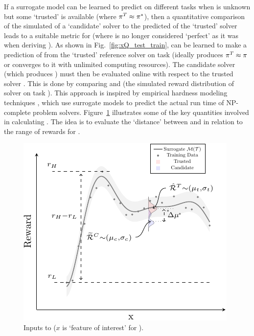 If a surrogate model \surrogate{} can be learned to predict \rwdtrust{} on different tasks when \piopt{} is unknown but some `trusted' \pitrust{} is available (where $\pi^T \approx \pi^*$), then a quantitative comparison of the simulated \rwdcandsim{} of a `candidate' solver to the predicted \rwdtrustpredict{} of the `trusted' solver leads to a suitable metric for \xQ{} (where \xQ{} is no longer considered `perfect' as it was when deriving \xO). 
As shown in Fig.~\ref{fig:xQ_test_train}, \surrogate{} can be learned to make a prediction \rwdtrustpredict{} of \rwdtrust{} from the `trusted' reference solver \solvetrust{} on task \task{} (ideally \solvetrust{} produces $\mathcal{\pi}^T \approx \mathcal{\pi}$ or converges to it with unlimited computing resources). The candidate solver \solvecand{} (which produces \policycand) must then be evaluated online with respect to the trusted solver \solvetrust{}. This is done by comparing \rwdtrustpredict{} and \rwdcandsim{} (the simulated reward distribution of solver \solvecand{} on task \task). This approach is inspired by empirical hardness modeling techniques \cite{Leyton-Brown2009-yr}, which use surrogate models to predict the actual run time of NP-complete problem solvers. 
Figure~\ref{fig:xQ_v2} illustrates some of the key quantities involved in calculating \xQ{}. The idea is to evaluate the `distance' between \rwdtrust{} and \rwdcand{} in relation to the range of rewards for \solvetrust{}. %
\begin{figure}[tb]
    \centering
    \includegraphics[width=0.65\linewidth]{Figures/xQ_v2.pdf}
    \caption{Inputs to \xQ{} ($x$ is `feature of interest' for \task). 
    }
    \label{fig:xQ_v2}
    \vspace{-0.3cm}
\end{figure}


